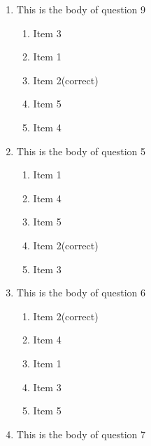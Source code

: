 \documentclass[amsfonts,bezier,leqno,fleqn,12pt,a4paper]{article}
\begin{document}
{{\begin{large}
\begin{enumerate}
\begin{enumerate}
\item  Item 1
\item  Item 5
\item  Item 2\hfill {\small (correct)}
\item  Item 4
\item  Item 3

\end{enumerate}
\newpage


\item This is the body of question 9
\vspace {0.3in}
\setcounter{equation}{0}

\begin{enumerate}
\item  Item 3
\item  Item 1
\item  Item 2\hfill {\small (correct)}
\item  Item 5
\item  Item 4

\end{enumerate}

\vspace {3.5cm}


\item This is the body of question 5
\vspace {0.3in}
\setcounter{equation}{0}

\begin{enumerate}
\item  Item 1
\item  Item 4
\item  Item 5
\item  Item 2\hfill {\small (correct)}
\item  Item 3

\end{enumerate}
\newpage


\item This is the body of question 6
\vspace {0.3in}
\setcounter{equation}{0}

\begin{enumerate}
\item  Item 2\hfill {\small (correct)}
\item  Item 4
\item  Item 1
\item  Item 3
\item  Item 5

\end{enumerate}

\vspace {3.5cm}


\item This is the body of question 7
\vspace {0.3in}
\setcounter{equation}{0}


\end{enumerate}
\end{large}}}
\end{document}
